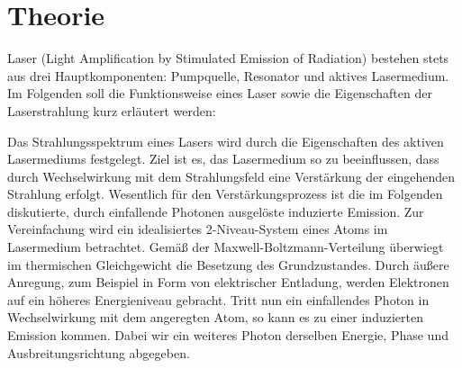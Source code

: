 \section{Theorie}
\label{sec:theorie}

Laser (Light Amplification by Stimulated Emission of Radiation) bestehen stets
aus drei Hauptkomponenten: Pumpquelle, Resonator und aktives Lasermedium. Im
Folgenden soll die Funktionsweise eines Laser sowie die Eigenschaften der
Laserstrahlung kurz erläutert werden:

Das Strahlungsspektrum eines Lasers wird durch die Eigenschaften des aktiven
Lasermediums festgelegt. Ziel ist es, das Lasermedium so zu beeinflussen, dass
durch Wechselwirkung mit dem Strahlungsfeld eine Verstärkung der eingehenden
Strahlung erfolgt. Wesentlich für den Verstärkungsprozess ist die im Folgenden
diskutierte, durch einfallende Photonen ausgelöste induzierte Emission. Zur
Vereinfachung wird ein idealisiertes 2-Niveau-System eines Atoms im Lasermedium
betrachtet. Gemäß der Maxwell-Boltzmann-Verteilung überwiegt im thermischen
Gleichgewicht die Besetzung des Grundzustandes. Durch äußere Anregung, zum
Beispiel in Form von elektrischer Entladung, werden Elektronen auf ein höheres
Energieniveau gebracht. Tritt nun ein einfallendes Photon in Wechselwirkung mit
dem angeregten Atom, so kann es zu einer induzierten Emission kommen. Dabei wir
ein weiteres Photon derselben Energie, Phase und Ausbreitungsrichtung abgegeben.
